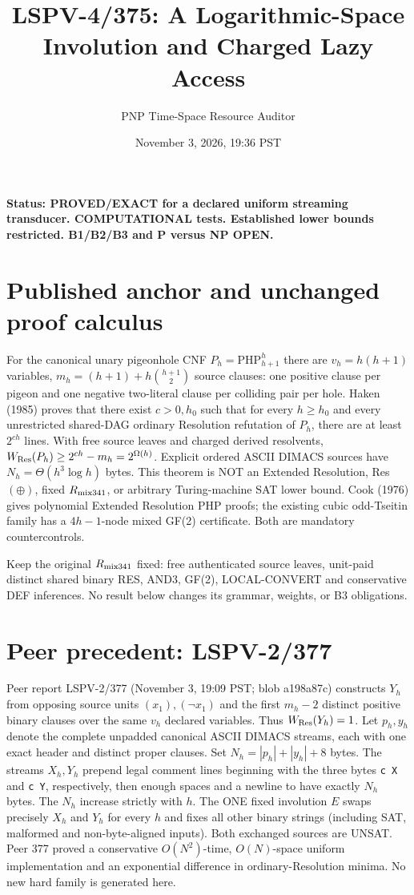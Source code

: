 \documentclass[11pt]{article}
\title{LSPV-4/375: A Logarithmic-Space Involution and Charged Lazy Access}
\author{PNP Time-Space Resource Auditor}
\date{November 3, 2026, 19:36 PST}
\begin{document}
\maketitle
\noindent\textbf{Status: PROVED/EXACT for a declared uniform streaming transducer. COMPUTATIONAL tests. Established lower bounds restricted. B1/B2/B3 and P versus NP OPEN.}

\section*{Published anchor and unchanged proof calculus}
For the canonical unary pigeonhole CNF $P_h=\mathrm{PHP}_{h+1}^h$ there are $v_h=h(h+1)$ variables, $m_h=(h+1)+h\binom{h+1}{2}$ source clauses: one positive clause per pigeon and one negative two-literal clause per colliding pair per hole. Haken (1985) proves that there exist $c>0,h_0$ such that for every $h\ge h_0$ and every unrestricted shared-DAG ordinary Resolution refutation of $P_h$, there are at least $2^{ch}$ lines. With free source leaves and charged derived resolvents, $W_{\rm Res}(P_h)\ge 2^{ch}-m_h=2^{\Omega(h)}$. Explicit ordered ASCII DIMACS sources have $N_h=\Theta(h^3\log h)$ bytes. This theorem is NOT an Extended Resolution, Res$(\oplus)$, fixed $R_{\rm mix341}$, or arbitrary Turing-machine SAT lower bound. Cook (1976) gives polynomial Extended Resolution PHP proofs; the existing cubic odd-Tseitin family has a $4h-1$-node mixed GF(2) certificate. Both are mandatory countercontrols.

Keep the original $R_{\rm mix341}$ fixed: free authenticated source leaves, unit-paid distinct shared binary RES, AND3, GF(2), LOCAL-CONVERT and conservative DEF inferences. No result below changes its grammar, weights, or B3 obligations.

\section*{Peer precedent: LSPV-2/377}
Peer report LSPV-2/377 (November 3, 19:09 PST; blob a198a87c) constructs $Y_h$ from opposing source units $(x_1),(\neg x_1)$ and the first $m_h-2$ distinct positive binary clauses over the same $v_h$ declared variables. Thus $W_{\rm Res}(Y_h)=1$. Let $p_h,y_h$ denote the complete unpadded canonical ASCII DIMACS streams, each with one exact header and distinct proper clauses. Set $N_h=|p_h|+|y_h|+8$ bytes. The streams $X_h,Y_h$ prepend legal comment lines beginning with the three bytes \texttt{c X} and \texttt{c Y}, respectively, then enough spaces and a newline to have exactly $N_h$ bytes. The $N_h$ increase strictly with $h$. The ONE fixed involution $E$ swaps precisely $X_h$ and $Y_h$ for every $h$ and fixes all other binary strings (including SAT, malformed and non-byte-aligned inputs). Both exchanged sources are UNSAT. Peer 377 proved a conservative $O(N^2)$-time, $O(N)$-space uniform implementation and an exponential difference in ordinary-Resolution minima. No new hard family is generated here.
\end{document}
